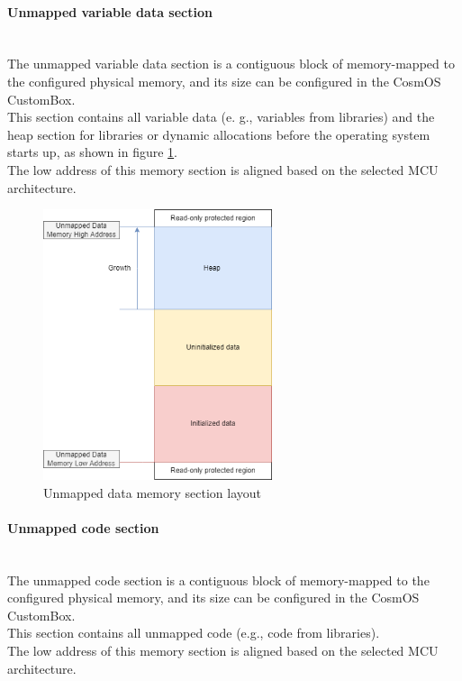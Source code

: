 \paragraph{Unmapped variable data section}\mbox{}\\
\indent The unmapped variable data section is a contiguous block of memory-mapped to the configured physical memory, and its size can be configured in the CosmOS CustomBox.\\
This section contains all variable data (e. g., variables from libraries) and the heap section for libraries or dynamic allocations before the operating system starts up, as shown in figure \ref{fig:UnmappedDataSection}.\\
\indent The low address of this memory section is aligned based on the selected \ac{MCU} architecture.

\begin{figure}[H]
\begin{center}
\includegraphics[width=0.6\textwidth]{images/unmapped_data.png}
\caption{Unmapped data memory section layout}
\label{fig:UnmappedDataSection}
\end{center}
\end{figure}

\paragraph{Unmapped code section}\mbox{}\\
\indent The unmapped code section is a contiguous block of memory-mapped to the configured physical memory, and its size can be configured in the CosmOS CustomBox.\\
This section contains all unmapped code (e.g., code from libraries).\\
\indent The low address of this memory section is aligned based on the selected \ac{MCU} architecture.

